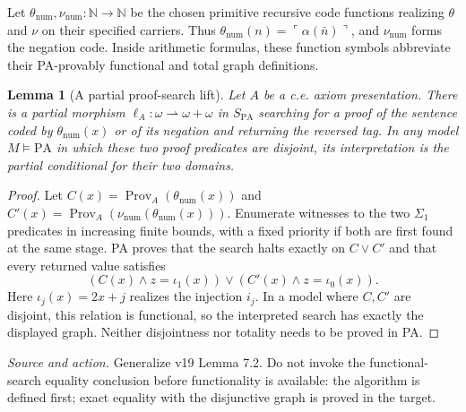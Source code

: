 \documentclass[11pt]{article}
\newtheorem{lemma}[theorem]{Lemma}
\theoremstyle{definition}\newtheorem{definition}[theorem]{Definition}
\newcommand{\PA}{\mathrm{PA}}
\newcommand{\N}{\mathbb N}
\newcommand{\Prov}{\operatorname{Prov}}
\newcommand{\source}[1]{\par\smallskip\noindent\textit{Source and action.} #1\par\smallskip}
\begin{document}
Let $\theta_{\mathrm{num}},\nu_{\mathrm{num}}:\N\to\N$ be the
chosen primitive recursive code functions realizing $\theta$ and
$\nu$ on their specified carriers. Thus
$\theta_{\mathrm{num}}(n)=\ulcorner\alpha(\bar n)\urcorner$,
and $\nu_{\mathrm{num}}$ forms the negation code. Inside arithmetic
formulas, these function symbols abbreviate their PA-provably
functional and total graph definitions.

\begin{lemma}[A partial proof-search lift]\label{lem:proof-search}
Let $A$ be a c.e. axiom presentation. There is a partial morphism
$\ell_A:\omega\rightharpoonup\omega+\omega$ in $S_{\PA}$
searching for a proof of the sentence coded by
$\theta_{\mathrm{num}}(x)$ or of its negation and returning
the reversed tag. In any model $M\models\PA$ in which these two
proof predicates are disjoint, its interpretation is the partial
conditional for their two domains.
\end{lemma}
\begin{proof}
Let $C(x)=\Prov_A(\theta_{\mathrm{num}}(x))$ and
$C'(x)=\Prov_A(\nu_{\mathrm{num}}(\theta_{\mathrm{num}}(x)))$.
Enumerate witnesses to the two
$\Sigma_1$ predicates in increasing finite bounds, with a fixed
priority if both are first found at the same stage. PA proves that
the search halts exactly on $C\lor C'$ and that every returned
value satisfies
\[
 (C(x)\land z=\iota_1(x))\lor
 (C'(x)\land z=\iota_0(x)).
\]
Here $\iota_j(x)=2x+j$ realizes the injection $i_j$.
In a model where $C,C'$ are disjoint, this relation is functional,
so the interpreted search has exactly the displayed graph.
Neither disjointness nor totality needs to be proved in PA.
\end{proof}
\source{Generalize v19 Lemma 7.2. Do not invoke the functional-search equality conclusion before functionality is available: the algorithm is defined first; exact equality with the disjunctive graph is proved in the target.}
\end{document}
